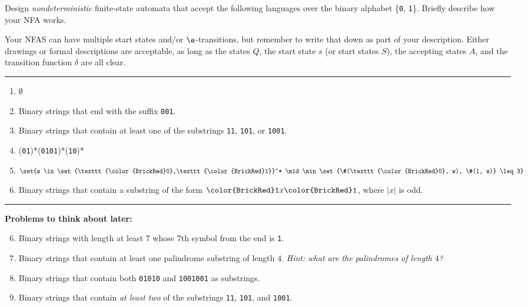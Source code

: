 \documentclass[11pt]{article}
\def\Sym#1{\texttt{\color{BrickRed}#1}}
\begin{document}

\noindent
Design \emph{nondeterministic} finite-state automata that accept the following
languages over the binary alphabet \{\Sym{0}, \Sym{1}\}. Briefly describe how your NFA works.

Your NFAS can have multiple start states and/or $\e$-transitions, but remember to write that
down as part of your description. Either drawings or formal descriptions are acceptable,
as long as the states $Q$, the start state $s$ (or start states $S$), the
accepting states $A$, and the transition function $\delta$ are all clear.

\bigskip\hrule\bigskip
\begin{enumerate}
\parindent 1.5em \itemsep 4ex
\setcounter{enumi}{-1}
\item $\emptyset$
\item Binary strings that end with the suffix \Sym{001}.
\item Binary strings that contain at least one of the substrings \Sym{11},
\Sym{101}, or \Sym{1001}.
\item (\Sym{01})*(\Sym{0101})*(\Sym{10})*
\item $\set{w \in \set{\Sym{0},\Sym{1}}^* \mid \min \set{\#(\Sym{0}, w), \#(1, w)} \leq 3}$
\item Binary strings that contain a substring of the form $\Sym{1}x\Sym{1}$, where $|x|$ is odd.
\end{enumerate}

\bigskip\hrule\bigskip
\noindent
\textbf{Problems to think about later:}

\begin{enumerate}
\setcounter{enumi}{5}
\item Binary strings with length at least $7$ whose $7$th symbol from the end is
\Sym{1}.
\item Binary strings that contain at least one palindrome substring of length
$4$. \emph{Hint: what are the palindromes of length $4$?}
\item Binary strings that contain both \Sym{01010} and \Sym{1001001} as 
substrings.
\item Binary strings that contain \emph{at least two} of the substrings 
\Sym{11}, \Sym{101}, and \Sym{1001}.

\end{enumerate}
\end{document}
